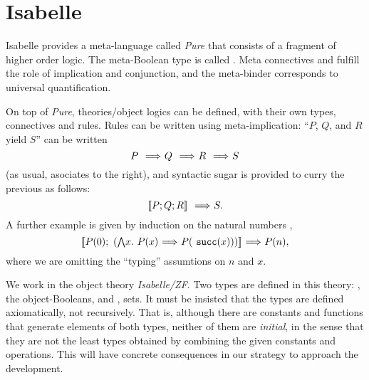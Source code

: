 \section{Isabelle}
Isabelle provides a meta-language called \emph{Pure} that consists of
a fragment of higher order logic. The meta-Boolean type is called
. Meta connectives
\isatt{\isasymLongrightarrow} and \isatt{\&\&\&} fulfill the role of
implication and conjunction, and the meta-binder \isatt{\isasymAnd}
corresponds to universal quantification. 

On top of \emph{Pure}, theories/object logics can be defined, with
their own types, connectives and rules. Rules can be written  using
meta-implication: ``$P$, $Q$, and $R$ yield $S$'' can be written
\[
P \ \isatt{\isasymLongrightarrow}\ Q\ \isatt{\isasymLongrightarrow}\ R\ \isatt{\isasymLongrightarrow}\ S
\]
(as usual,  \isatt{\isasymLongrightarrow} asociates to the right), and
syntactic sugar is provided to curry the previous as follows:
\[
\isasymlbrakk P; Q; R \isasymrbrakk \ \isatt{\isasymLongrightarrow}\ S.
\]
A further example is given by induction on the natural numbers
,
\[
\isasymlbrakk P(0);\ (\textstyle\isasymAnd
x.\ P(x)\ \isasymLongrightarrow\ P(\isatt{succ}(x))) \isasymrbrakk
\ \isasymLongrightarrow\ P(n), 
\]
where we are omitting the ``typing'' assumtions on $n$ and $x$.

We work in the object theory \emph{Isabelle/ZF}. Two types are defined
in this theory: \tyo, the object-Booleans, and \tyi,
sets. It must be insisted that the types are defined axiomatically, not
recursively. That is, although there are constants and functions that
generate elements of both types, neither of them are 
\emph{initial}, in the sense that they are not the least types
obtained by combining the given constants and operations. This will
have concrete consequences in our strategy to approach the development.



